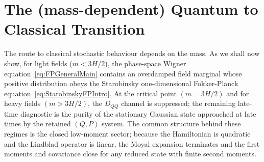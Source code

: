 \documentclass{article}
\numberwithin{equation}{section}
\begin{document}
	\section{The (mass-dependent) Quantum to Classical Transition}
	\label{sec:quantum_to_classical}

	The route to classical stochastic behaviour depends on the mass. As we shall now show, for light fields ($m<3H/2$), the phase-space Wigner equation~\eqref{eq:FPGeneralMain} contains an overdamped field marginal whose positive distribution obeys the Starobinsky one-dimensional Fokker-Planck equation~\eqref{eq:StarobinskyFPIntro}. At the critical point \((m=3H/2)\) and for heavy fields \((m>3H/2)\), the \(D_{QQ}\) channel is suppressed; the remaining late-time diagnostic is the purity of the stationary Gaussian state approached at late times by the retained \((Q,P)\) system. The common structure behind these regimes is the closed low-moment sector; because the Hamiltonian is quadratic and the Lindblad operator is linear, the Moyal expansion terminates and the first moments and covariance close for any reduced state with finite second moments.
\end{document}
